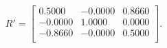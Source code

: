 \begin{equation*}
R' = 
\begin{bmatrix}
  0.5000 &  -0.0000 &   0.8660 \\
 -0.0000 &   1.0000 &   0.0000 \\
 -0.8660 &  -0.0000 &   0.5000 \\
\end{bmatrix}.
\end{equation*}
